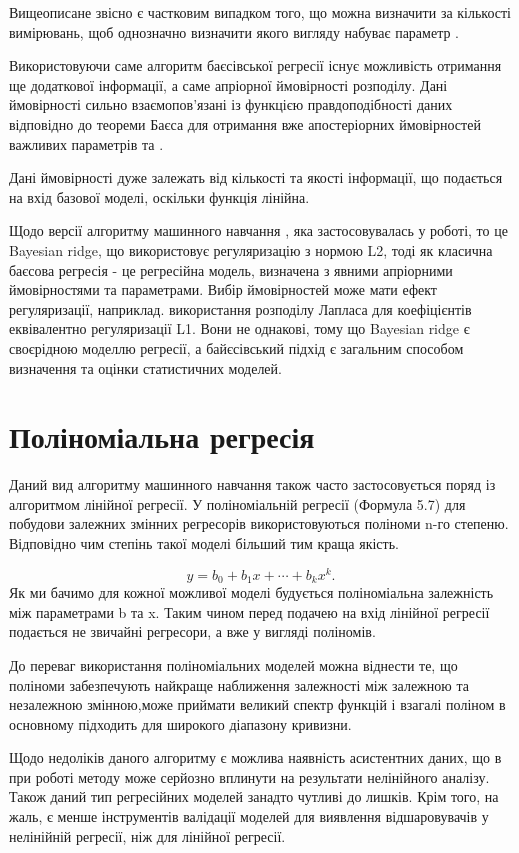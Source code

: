 Вищеописане звісно є частковим випадком того, що можна визначити за кількості вимірювань, щоб однозначно визначити якого вигляду набуває параметр .

Використовуючи саме алгоритм баєсівської регресії існує можливість отримання ще додаткової інформації, а саме апріорної ймовірності розподілу. Дані ймовірності сильно взаємопов'язані із функцією правдоподібності даних відповідно до теореми Баєса для отримання вже апостеріорних ймовірностей важливих параметрів та .

Дані ймовірності дуже залежать від кількості та якості інформації, що подається на вхід базової моделі, оскільки функція лінійна.

Щодо версії алгоритму машинного навчання , яка застосовувалась у роботі, то це Bayesian ridge, що використовує регуляризацію з нормою L2, тоді як класична баєсова регресія - це регресійна модель, визначена з явними апріорними ймовірностями та параметрами. Вибір ймовірностей може мати ефект регуляризації, наприклад. використання розподілу Лапласа для коефіцієнтів еквівалентно регуляризації L1. Вони не однакові, тому що Bayesian ridge є своєрідною моделлю регресії, а байєсівський підхід є загальним способом визначення та оцінки статистичних моделей.

\section{Поліноміальна регресія}
Даний вид алгоритму \cite{ref7} машинного навчання також часто застосовується поряд із алгоритмом лінійної регресії. У поліноміальній регресії (Формула 5.7) для побудови залежних змінних регресорів використовуються поліноми n-го степеню. Відповідно чим степінь такої моделі більший тим краща якість.

\begin{equation}\label{eq:polynomial}y=b_0+b_1x+\cdots+b_kx^k.\end{equation}
Як ми бачимо для кожної можливої моделі будується поліноміальна залежність між параметрами b та x. Таким чином перед подачею на вхід лінійної регресії подається не звичайні регресори, а вже у вигляді поліномів.

До переваг використання поліноміальних моделей можна віднести те, що поліноми забезпечують найкраще наближення залежності між залежною та незалежною змінною,може приймати великий спектр функцій і взагалі поліном в основному підходить для широкого діапазону кривизни.

Щодо недоліків даного алгоритму є можлива наявність асистентних даних, що в при роботі методу може серйозно вплинути на результати нелінійного аналізу. Також даний тип регресійних моделей занадто чутливі до лишків. Крім того, на жаль, є менше інструментів валідації моделей для виявлення відшаровувачів у нелінійній регресії, ніж для лінійної регресії.

